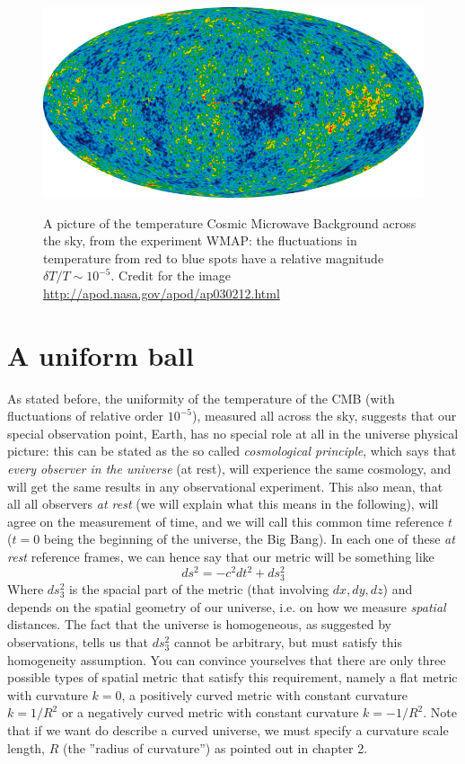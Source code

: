 \documentclass[11pt, a4paper,oneside,openright]{book}
\numberwithin{equation}{section}
\begin{document}
\begin{figure}
\begin{center}
\includegraphics[scale=0.5]{Draw/wmap}
\label{}
\end{center}
\caption{A picture of the temperature Cosmic Microwave Background across the sky, from the experiment WMAP: the fluctuations in temperature from red to blue spots have a relative magnitude $\delta T/T\sim 10^{-5}$.  Credit for the image \url{http://apod.nasa.gov/apod/ap030212.html}}
\label{cmb}
\end{figure}

\section{A uniform ball} 
As stated before, the uniformity of the temperature of the CMB (with fluctuations of relative order $10^{-5}$), measured all across the sky, suggests that our special observation point, Earth, has no special role at all in the universe physical picture: this can be stated as the so called \textit{cosmological principle}, which says that \textit{every observer in the universe} (at rest), will experience the same cosmology, and will get the same results in any observational experiment. This also mean, that all all observers \textit{at rest} (we will explain what this means in the following), will agree on the measurement of time, and we will call this common time reference $t$ ($t=0$ being the beginning of the universe, the Big Bang). In each one of these \textit{at rest} reference frames, we can hence say that our metric will be something like
\begin{equation}
\label{frwsymb}
ds^2=-c^2dt^2+ds_3^2
\end{equation}    
Where $ds_3^2$ is the spacial part of the metric (that involving $dx,dy,dz$) and depends on the spatial geometry of our universe, i.e. on how we measure \textit{spatial} distances. The fact that the universe is homogeneous, as suggested by observations, tells us that $ds_3^2$ cannot be arbitrary, but must satisfy this homogeneity assumption. You can convince yourselves that there are only three possible types of spatial metric that satisfy this requirement, namely a flat metric with curvature $k=0$, a positively curved metric with constant curvature $k=1/R^2$ or a negatively curved metric with constant curvature $k=-1/R^2$. Note that if we want do describe a curved universe, we must specify a curvature scale length, $R$ (the ''radius of curvature'') as pointed out in chapter 2. 
\end{document}
